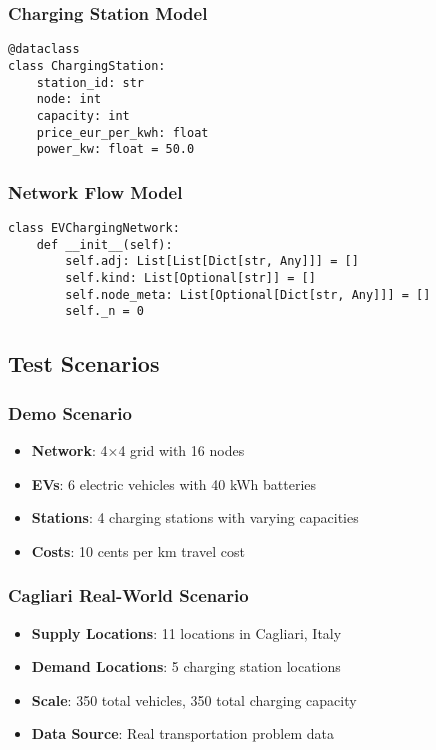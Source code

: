 \documentclass[12pt,a4paper]{article}
\begin{document}
\subsubsection{Charging Station Model}
\begin{lstlisting}[caption=Charging Station Data Structure]
@dataclass
class ChargingStation:
    station_id: str
    node: int
    capacity: int
    price_eur_per_kwh: float
    power_kw: float = 50.0
\end{lstlisting}

\subsubsection{Network Flow Model}
\begin{lstlisting}[caption=Residual Network Structure]
class EVChargingNetwork:
    def __init__(self):
        self.adj: List[List[Dict[str, Any]]] = []
        self.kind: List[Optional[str]] = []
        self.node_meta: List[Optional[Dict[str, Any]]] = []
        self._n = 0
\end{lstlisting}

\subsection{Test Scenarios}

\subsubsection{Demo Scenario}
\begin{itemize}
    \item \textbf{Network}: 4×4 grid with 16 nodes
    \item \textbf{EVs}: 6 electric vehicles with 40 kWh batteries
    \item \textbf{Stations}: 4 charging stations with varying capacities
    \item \textbf{Costs}: 10 cents per km travel cost
\end{itemize}

\subsubsection{Cagliari Real-World Scenario}
\begin{itemize}
    \item \textbf{Supply Locations}: 11 locations in Cagliari, Italy
    \item \textbf{Demand Locations}: 5 charging station locations
    \item \textbf{Scale}: 350 total vehicles, 350 total charging capacity
    \item \textbf{Data Source}: Real transportation problem data
\end{itemize}
\end{document}
